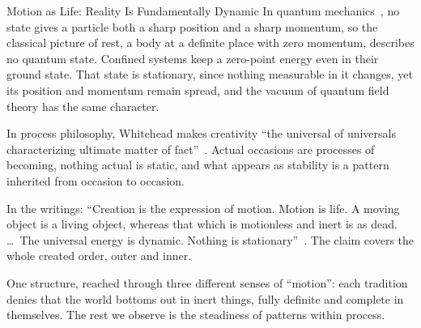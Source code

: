 \begin{convergencemoment}{Motion as Life: Reality Is Fundamentally Dynamic}
In quantum mechanics~\citep{Heisenberg1927}, no state gives a particle both a sharp position and a sharp momentum, so the classical picture of rest, a body at a definite place with zero momentum, describes no quantum state.
Confined systems keep a zero-point energy even in their ground state.
That state is stationary, since nothing measurable in it changes, yet its position and momentum remain spread, and the vacuum of quantum field theory has the same character.

In process philosophy, Whitehead makes creativity ``the universal of universals characterizing ultimate matter of fact''~\citep[p.~21]{Whitehead1929}.
Actual occasions are processes of becoming, nothing actual is static, and what appears as stability is a pattern inherited from occasion to occasion.

In the \bahai writings: ``Creation is the expression of motion. Motion is life. A moving object is a living object, whereas that which is motionless and inert is as dead. \ldots\ The universal energy is dynamic. Nothing is stationary''~\citep[Talk 52]{PUP}.
The claim covers the whole created order, outer and inner.

One structure, reached through three different senses of ``motion'': each tradition denies that the world bottoms out in inert things, fully definite and complete in themselves.
The rest we observe is the steadiness of patterns within process.
\end{convergencemoment}
